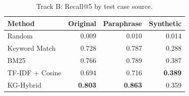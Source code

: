 \begin{table}[t]
\centering
\caption{Track B: Recall@5 by test case source.}
\label{tab:extended-source}
\begin{tabular}{lrrr}
\toprule
Method & Original & Paraphrase & Synthetic \\
\midrule
Random & 0.009 & 0.010 & 0.014 \\
Keyword Match & 0.728 & 0.787 & 0.288 \\
BM25 & 0.766 & 0.789 & 0.387 \\
TF-IDF + Cosine & 0.694 & 0.716 & \textbf{0.389} \\
KG-Hybrid & \textbf{0.803} & \textbf{0.863} & 0.359 \\
\bottomrule
\end{tabular}
\end{table}